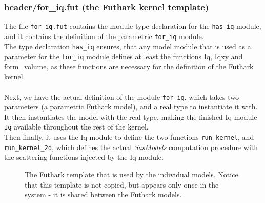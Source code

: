 \documentclass[11pt]{article}
\newcommand{\sasmodels}{\textit{SasModels}}
\newcommand{\foriq}{\texttt{for\_iq}}
\newcommand{\hasiq}{\texttt{has\_iq}}
\begin{document}
\subsubsection{header/for\_iq.fut (the Futhark kernel template)}
The file \texttt{for\_iq.fut} contains the module type declaration for the \hasiq{} module,
 and it contains the definition of the parametric \foriq{} module. 
\\
The type declaration \hasiq{} ensures, that any model module that is
used as a parameter for the \foriq{} module defines at least the functions
Iq, Iqxy and form\_volume, as these functions are necessary for the definition
of the Futhark kernel.
\\\\
Next, we have the actual definition of the module \foriq{}, which takes two parameters (a parametric Futhark model), and a real type to instantiate it with.
It then instantiates the model with the real type, making the finished Iq module
\texttt{Iq} available throughout the rest of the kernel.
\\
Then finally, it uses the Iq module to define the two functions 
\texttt{run\_kernel}, and \texttt{run\_kernel\_2d}, which defines the actual 
\sasmodels{} computation procedure with the scattering functions injected by 
the Iq module.

\begin{figure}
  
  \caption{The Futhark template that is used by the individual models. Notice
    that this template is not copied, but appears only once in the system - it
    is shared between the Futhark models.}
  \label{fig:for-iq}
\end{figure}
\end{document}

